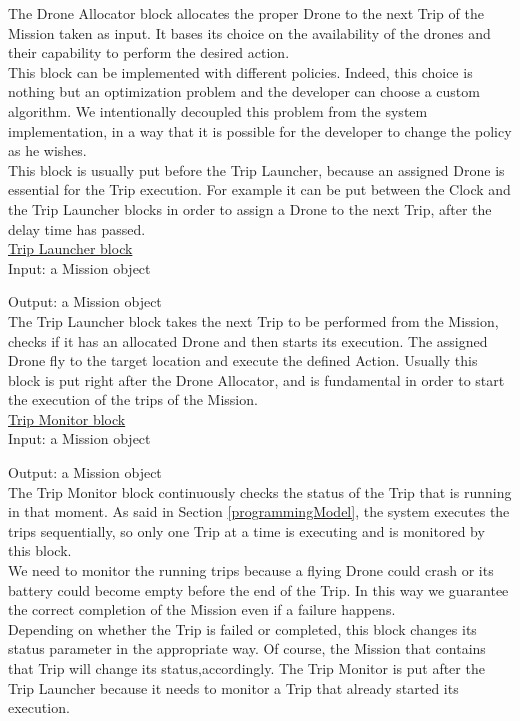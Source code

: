 The Drone Allocator block allocates the proper Drone to the next Trip of the Mission taken as input.
It bases its choice on the availability of the drones and their capability to perform the desired action.
\\
This block can be implemented with different policies. Indeed, this choice is nothing but an optimization problem and the developer can choose a custom algorithm. 
We intentionally decoupled this problem from the system implementation, in a way that it is possible for the developer to change the policy as he wishes.
\\
This block is usually put before the Trip Launcher, because an assigned Drone is essential for the Trip execution.
For example it can be put between the Clock and the Trip Launcher blocks in order to assign a Drone to the next Trip,  after the delay time has passed.
\\

\underline{Trip Launcher block}
\\

Input: a Mission object

Output: a Mission object
\\

The Trip Launcher block takes the next Trip to be performed from the Mission, checks if it has an allocated Drone and then starts its execution.
The assigned Drone fly to the target location and execute the defined Action.
Usually this block is put right after the Drone Allocator, and is fundamental in order to start the execution of the trips of the Mission.
\\

\underline{Trip Monitor block}
\\

Input: a Mission object

Output: a Mission object
\\

The Trip Monitor block continuously checks the status of the Trip that is running in that moment.
As said in Section \ref{programmingModel}, the system executes the trips sequentially, so only one Trip at a time is executing and is monitored by this block. 
\\
We need to monitor the running trips because a flying Drone could crash or its battery could become empty before the end of the Trip. 
In this way we guarantee the correct completion of the Mission even if a failure happens.
\\
Depending on whether the Trip is failed or completed, this block changes its status parameter in the appropriate way.
Of course, the Mission that contains that Trip will change its status,accordingly.
The Trip Monitor is put after the Trip Launcher because it needs to monitor a Trip that already started its execution.
\\

